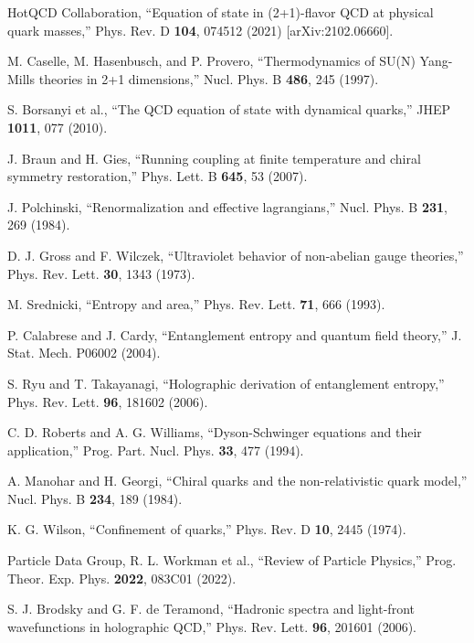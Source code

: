 \documentclass[12pt,a4paper]{article}
\begin{document}
\begin{thebibliography}{99}

 HotQCD Collaboration, ``Equation of state in (2+1)-flavor QCD at physical quark masses,'' Phys. Rev. D \textbf{104}, 074512 (2021) [arXiv:2102.06660].

 M. Caselle, M. Hasenbusch, and P. Provero, ``Thermodynamics of SU(N) Yang-Mills theories in 2+1 dimensions,'' Nucl. Phys. B \textbf{486}, 245 (1997).

 S. Borsanyi et al., ``The QCD equation of state with dynamical quarks,'' JHEP \textbf{1011}, 077 (2010).

 J. Braun and H. Gies, ``Running coupling at finite temperature and chiral symmetry restoration,'' Phys. Lett. B \textbf{645}, 53 (2007).

 J. Polchinski, ``Renormalization and effective lagrangians,'' Nucl. Phys. B \textbf{231}, 269 (1984).

 D. J. Gross and F. Wilczek, ``Ultraviolet behavior of non-abelian gauge theories,'' Phys. Rev. Lett. \textbf{30}, 1343 (1973).

 M. Srednicki, ``Entropy and area,'' Phys. Rev. Lett. \textbf{71}, 666 (1993).

 P. Calabrese and J. Cardy, ``Entanglement entropy and quantum field theory,'' J. Stat. Mech. P06002 (2004).

 S. Ryu and T. Takayanagi, ``Holographic derivation of entanglement entropy,'' Phys. Rev. Lett. \textbf{96}, 181602 (2006).

 C. D. Roberts and A. G. Williams, ``Dyson-Schwinger equations and their application,'' Prog. Part. Nucl. Phys. \textbf{33}, 477 (1994).

 A. Manohar and H. Georgi, ``Chiral quarks and the non-relativistic quark model,'' Nucl. Phys. B \textbf{234}, 189 (1984).

 K. G. Wilson, ``Confinement of quarks,'' Phys. Rev. D \textbf{10}, 2445 (1974).

 Particle Data Group, R. L. Workman et al., ``Review of Particle Physics,'' Prog. Theor. Exp. Phys. \textbf{2022}, 083C01 (2022).

 S. J. Brodsky and G. F. de Teramond, ``Hadronic spectra and light-front wavefunctions in holographic QCD,'' Phys. Rev. Lett. \textbf{96}, 201601 (2006).


\end{thebibliography}
\end{document}
